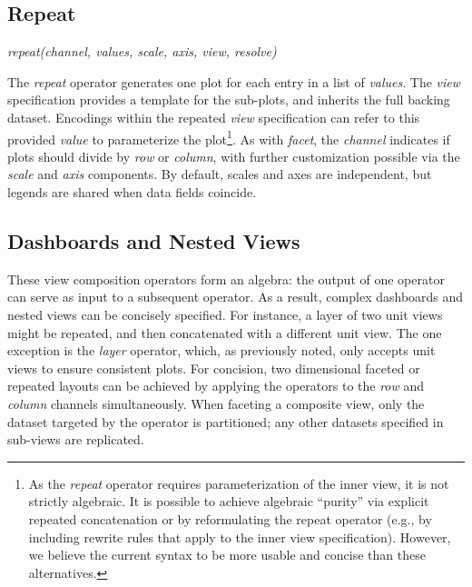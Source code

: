 \subsection{Repeat}

\centerline{
  \emph{repeat(channel, values, scale, axis, view, resolve)}
}

The \emph{repeat} operator generates one plot for each entry in a list of
\emph{values}. The \emph{view} specification provides a template for the
sub-plots, and inherits the full backing dataset. Encodings within the
repeated \emph{view} specification can refer to this provided \emph{value} to
parameterize the plot\footnote{As the \emph{repeat} operator requires
parameterization of the inner view, it is not strictly algebraic. It is
possible to achieve algebraic ``purity'' via explicit repeated concatenation
or by reformulating the repeat operator (e.g., by including rewrite rules that
apply to the inner view specification). However, we believe the current syntax
to be more usable and concise than these alternatives.}. As with \emph{facet},
the \emph{channel} indicates if plots should divide by \emph{row} or
\emph{column}, with further customization possible via the \emph{scale} and
\emph{axis} components. By default, scales and axes are independent, but
legends are shared when data fields coincide.

\subsection{Dashboards and Nested Views}

These view composition operators form an algebra: the output of one operator can
serve as input to a subsequent operator. As a result, complex dashboards and
nested views can be concisely specified. For instance, a layer of two unit views
might be repeated, and then concatenated with a different unit view. The one
exception is the \emph{layer} operator, which, as previously noted, only accepts
unit views to ensure consistent plots. For concision, two dimensional faceted or
repeated layouts can be achieved by applying the operators to the \emph{row} and
\emph{column} channels simultaneously. When faceting a composite view, only the
dataset targeted by the operator is partitioned; any other datasets specified in
sub-views are replicated.